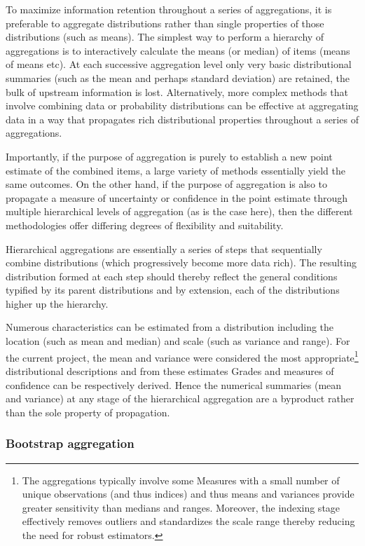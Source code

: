 To maximize information retention throughout a series of aggregations, it is preferable to aggregate
distributions rather than single properties of those distributions (such as means). The simplest way
to perform a hierarchy of aggregations is to interactively calculate the means (or median) of items
(means of means etc). At each successive aggregation level only very basic distributional summaries
(such as the mean and perhaps standard deviation) are retained, the bulk of upstream information is
lost. Alternatively, more complex methods that involve combining data or probability distributions
can be effective at aggregating data in a way that propagates rich distributional properties
throughout a series of aggregations.

Importantly, if the purpose of aggregation is purely to establish a new point estimate of the
combined items, a large variety of methods essentially yield the same outcomes. On the other hand,
if the purpose of aggregation is also to propagate a measure of uncertainty or confidence in the
point estimate through multiple hierarchical levels of aggregation (as is the case here), then the
different methodologies offer differing degrees of flexibility and suitability.

Hierarchical aggregations are essentially a series of steps that sequentially combine distributions
(which progressively become more data rich). The resulting distribution formed at each step should
thereby reflect the general conditions typified by its parent distributions and by extension, each
of the distributions higher up the hierarchy.

Numerous characteristics can be estimated from a distribution including the location (such as mean
and median) and scale (such as variance and range). For the current project, the mean and variance
were considered the most appropriate\footnote{The aggregations typically involve some Measures with
a small number of unique observations (and thus indices) and thus means and variances provide
greater sensitivity than medians and ranges.  Moreover, the indexing stage effectively removes
outliers and standardizes the scale range thereby reducing the need for robust estimators.}
distributional descriptions and from these estimates Grades and measures of confidence can be
respectively derived. Hence the numerical summaries (mean and variance) at any stage of the
hierarchical aggregation are a byproduct rather than the sole property of propagation.


\subsubsection{Bootstrap aggregation}

